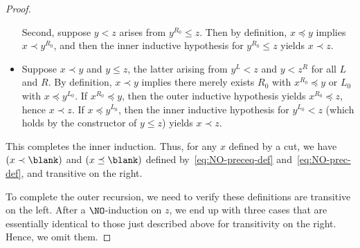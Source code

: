 \begin{proof}
\begin{itemize}
    Second, suppose $y<z$ arises from $y^{R_0}\le z$.
    Then by definition, $x\preceq y$ implies $x\prec y^{R_0}$, and then the inner inductive hypothesis for $y^{R_0}\le z$ yields $x\prec z$.
  \item Suppose $x\prec y$ and $y\le z$, the latter arising from $y^L<z$ and $y<z^R$ for all $L$ and $R$.
    By definition, $x\prec y$ implies there merely exists $R_0$ with $x^{R_0}\preceq y$ or $L_0$ with $x\preceq y^{L_0}$.
    If $x^{R_0}\preceq y$, then the outer inductive hypothesis yields $x^{R_0}\preceq z$, hence $x\prec z$.
    If $x\preceq y^{L_0}$, then the inner inductive hypothesis for $y^{L_0}<z$ (which holds by the constructor of $y\le z$) yields $x\prec z$.

  \end{itemize}
  This completes the inner induction.
  Thus, for any $x$ defined by a cut, we have $(x\prec \blank)$ and $(x\preceq \blank)$ defined by~\eqref{eq:NO-preceq-def} and~\eqref{eq:NO-prec-def}, and transitive on the right.

  To complete the outer recursion, we need to verify these definitions are transitive on the left.
  After a $\NO$-induction on $z$, we end up with three cases that are essentially identical to those just described above for transitivity on the right.
  Hence, we omit them.
\end{proof}

